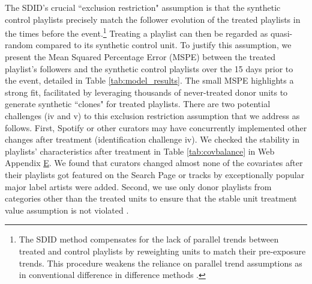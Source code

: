 The SDID's crucial ``exclusion restriction" assumption is that the synthetic control playlists precisely match the follower evolution of the treated playlists in the times before the event.\footnote{The SDID method compensates for the lack of parallel trends between treated and control playlists by reweighting units to match their pre-exposure trends. This procedure weakens the reliance on parallel trend assumptions as in conventional difference in difference methods \citep{SDiD_AER_Arkhangelsky_21}.} Treating a playlist can then be regarded as quasi-random compared to its synthetic control unit. To justify this assumption, we present the Mean Squared Percentage Error (MSPE) between the treated playlist's followers and the synthetic control playlists over the 15 days prior to the event, detailed in Table \ref{tab:model_results}. The small MSPE highlights a strong fit, facilitated by leveraging thousands of never-treated donor units to generate synthetic ``clones" for treated playlists. There are two potential challenges (iv and v) to this exclusion restriction assumption that we address as follows. First, Spotify or other curators may have concurrently implemented other changes after treatment (identification challenge iv). We checked the stability in playlists' characteristics after treatment in Table \ref{tab:covbalance} in Web Appendix \hyperref[appendix:stability_test]{E}. We found that curators changed almost none of the covariates after their playlists got featured on the Search Page or tracks by exceptionally popular major label artists were added. %
Second, we use only donor playlists from categories other than the treated units to ensure that the stable unit treatment value assumption is not violated \citep[][]{goldfarb2022conducting}.   


